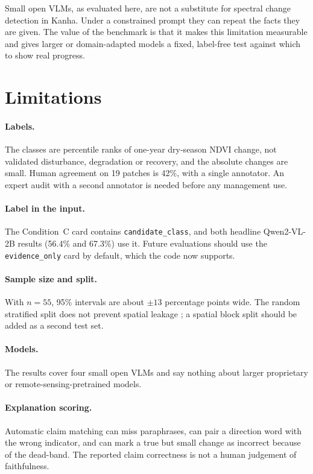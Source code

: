 Small open VLMs, as evaluated here, are not a substitute for spectral
change detection in Kanha. Under a constrained prompt they can repeat
the facts they are given. The value of the benchmark is that it makes
this limitation measurable and gives larger or domain-adapted models a
fixed, label-free test against which to show real progress.


\section*{Limitations}

\paragraph{Labels.} The classes are percentile ranks of one-year
dry-season NDVI change, not validated disturbance, degradation or
recovery, and the absolute changes are small. Human agreement on 19
patches is 42\%, with a single annotator. An expert audit with a second
annotator is needed before any management use.

\paragraph{Label in the input.} The Condition~C card contains
\texttt{candidate\_class}, and both headline Qwen2-VL-2B results (56.4\%
and 67.3\%) use it. Future evaluations should use the
\texttt{evidence\_only} card by default, which the code now supports.


\paragraph{Sample size and split.} With $n = 55$, 95\% intervals are about
$\pm 13$ percentage points wide. The random stratified split does not
prevent spatial leakage ; a spatial block split should
be added as a second test set.

\paragraph{Models.} The results cover four small open VLMs and say nothing
about larger proprietary or remote-sensing-pretrained models.

\paragraph{Explanation scoring.} Automatic claim matching can miss
paraphrases, can pair a direction word with the wrong indicator, and can
mark a true but small change as incorrect because of the dead-band. The
reported claim correctness is not a human judgement of faithfulness.



